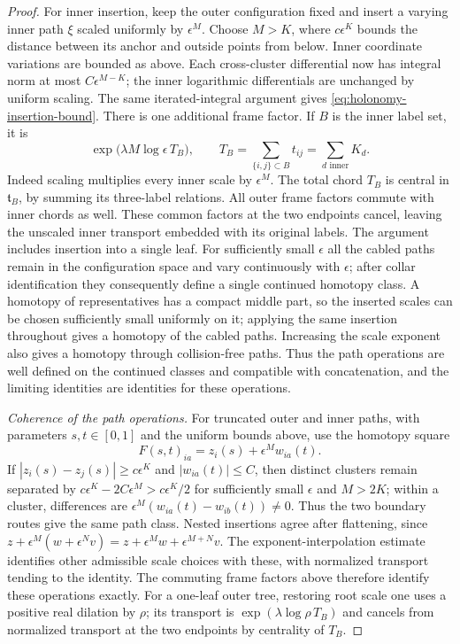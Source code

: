 \documentclass[11pt]{article}
\theoremstyle{definition}
\theoremstyle{remark}
\numberwithin{equation}{section}
\begin{document}
\begin{proof}
For inner insertion, keep the outer configuration fixed and insert a
varying inner path $\xi$ scaled uniformly by $\epsilon^M$.  Choose
$M>K$, where $c\epsilon^K$ bounds the distance between its anchor and
outside points from below.  Inner coordinate variations are bounded
as above.  Each cross-cluster differential now has integral norm at
most $C\epsilon^{M-K}$; the inner logarithmic differentials are
unchanged by uniform scaling.  The same iterated-integral argument
gives \eqref{eq:holonomy-insertion-bound}.  There is one additional
frame factor.  If $B$ is the inner label set, it is
\begin{equation}\label{eq:holonomy-central-scale}
 \exp\bigl(\lambda M\log\epsilon\,T_B\bigr),
 \qquad T_B=\sum_{\{i,j\}\subset B}t_{ij}
          =\sum_{d\text{ inner}}K_d.
\end{equation}
Indeed scaling multiplies every inner scale by $\epsilon^M$.
The total chord $T_B$ is central in $\mathfrak t_B$, by summing its
three-label relations.  All outer frame factors commute with inner
chords as well.  These common factors at the two endpoints cancel,
leaving the unscaled inner transport embedded with its original
labels.  The argument includes insertion into a single leaf.
For sufficiently small $\epsilon$ all the cabled paths remain in the
configuration space and vary continuously with $\epsilon$; after
collar identification they consequently define a single continued
homotopy class.  A homotopy of representatives has a compact middle
part, so the inserted scales can be chosen sufficiently small uniformly
on it; applying the same insertion throughout gives a homotopy of the
cabled paths.  Increasing the scale exponent also gives a homotopy
through collision-free paths.  Thus the path operations are well
defined on the continued classes and compatible with concatenation,
and the limiting identities are identities for these operations.

\emph{Coherence of the path operations.}
For truncated outer and inner paths, with parameters $s,t\in[0,1]$
and the uniform bounds above, use the homotopy square
\[
 F(s,t)_{ia}=z_i(s)+\epsilon^M w_{ia}(t).
\]
If $|z_i(s)-z_j(s)|\ge c\epsilon^K$ and
$|w_{ia}(t)|\le C$, then distinct clusters remain separated by
$c\epsilon^K-2C\epsilon^M>c\epsilon^K/2$ for sufficiently small
$\epsilon$ and $M>2K$; within a cluster, differences are
$\epsilon^M(w_{ia}(t)-w_{ib}(t))\ne0$.  Thus the two boundary
routes give the same path class.  Nested insertions agree after
flattening, since
$z+\epsilon^M(w+\epsilon^Nv)=z+\epsilon^Mw+\epsilon^{M+N}v$.
The exponent-interpolation estimate identifies other admissible
scale choices with these, with normalized transport tending to the
identity.  The commuting frame factors above therefore identify
these operations exactly.  For a one-leaf outer tree, restoring
root scale one uses a positive real dilation by $\rho$; its transport
is $\exp(\lambda\log\rho\,T_B)$ and cancels from normalized transport
at the two endpoints by centrality of $T_B$.


\end{proof}
\end{document}
